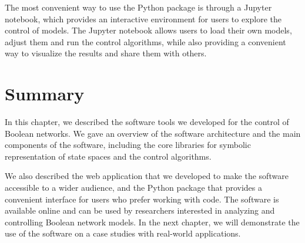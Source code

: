 The most convenient way to use the Python package is through a Jupyter notebook, which provides an interactive environment for users to explore the control of \PBN{} models. The Jupyter notebook allows users to load their own models, adjust them and run the control algorithms, while also providing a convenient way to visualize the results and share them with others.



\section{Summary}
In this chapter, we described the software tools we developed for the control of Boolean networks. We gave an overview of the software architecture and the main components of the software, including the core libraries for symbolic representation of state spaces and the control algorithms. 

We also described the web application that we developed to make the software accessible to a wider audience, and the Python package that provides a convenient interface for users who prefer working with code. The software is available online and can be used by researchers interested in analyzing and controlling Boolean network models. In the next chapter, we will demonstrate the use of the software on a case studies with real-world applications.